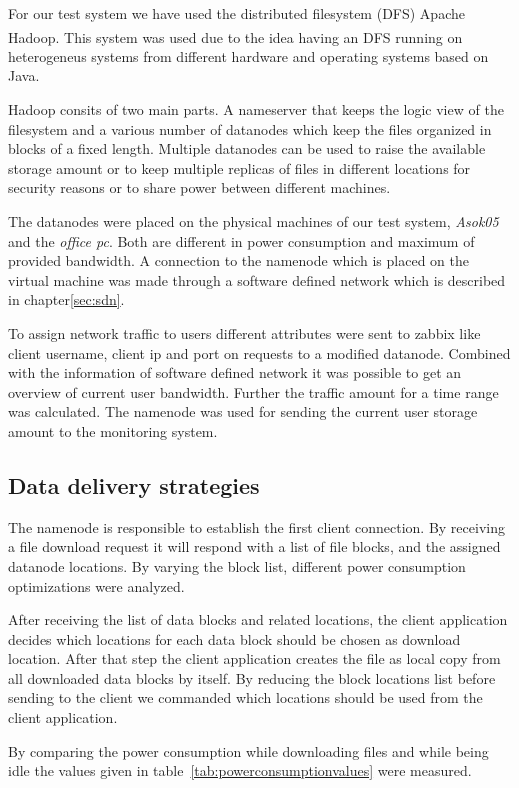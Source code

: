For our test system we have used the distributed filesystem (DFS) Apache Hadoop\textsuperscript{\textregistered}. This system was used due to the idea having an DFS running on heterogeneus systems from different hardware and operating systems based on Java. 

Hadoop consits of two main parts. A nameserver that keeps the logic view of the filesystem and a various number of datanodes which keep the files organized in blocks of a fixed length. Multiple datanodes can be used to raise the available storage amount or to keep multiple replicas of files in different locations for security reasons or to share power between different machines. 

The datanodes were placed on the physical machines of our test system, \textit{Asok05} and the \textit{office pc}. Both are different in power consumption and maximum of provided bandwidth. A connection to the namenode which is placed on the virtual machine was made through a software defined network which is described in chapter\ref{sec:sdn}.

To assign network traffic to users different attributes were sent to zabbix like client username, client ip and port on requests to a modified datanode.
Combined with the information of software defined network it was possible to get an overview of current user bandwidth. Further the traffic amount for a time range was calculated. The namenode was used for sending the current user storage amount to the monitoring system.

\subsection{Data delivery strategies}

The namenode is responsible to establish the first client connection. By receiving a file download request it will respond with a list of file blocks, and the assigned datanode locations. By varying the block list, different power consumption optimizations were analyzed.

After receiving the list of data blocks and related locations, the client application decides which locations for each data block should be chosen as download location. After that step the client application creates the file as local copy from all downloaded data blocks by itself. By reducing the block locations list before sending to the client we commanded which locations should be used from the client application.

By comparing the power consumption while downloading files and while being idle the values given in table~\ref{tab:powerconsumptionvalues} were measured.

